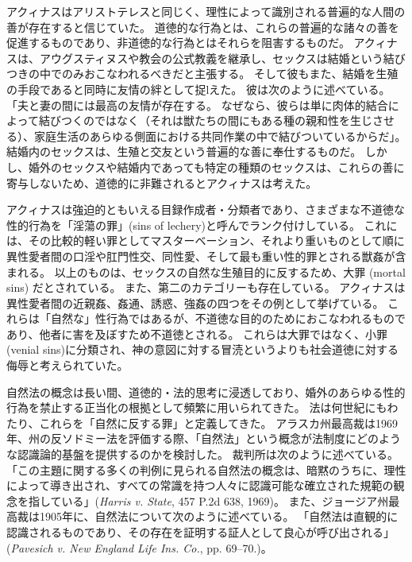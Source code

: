 \documentclass[paper=a4,book,openany]{jlreq} \usepackage{mystyle}
\begin{document}
アクィナスはアリストテレスと同じく、理性によって識別される普遍的な人間の善が存在すると信じていた。
道徳的な行為とは、これらの普遍的な諸々の善を促進するものであり、非道徳的な行為とはそれらを阻害するものだ。
アクィナスは、アウグスティヌスや教会の公式教義を継承し、セックスは結婚という結びつきの中でのみおこなわれるべきだと主張する。
そして彼もまた、結婚を生殖の手段であると同時に友情の絆として捉lえた。
彼は次のように述べている。
「夫と妻の間には最高の友情が存在する。
なぜなら、彼らは単に肉体的結合によって結びつくのではなく（それは獣たちの間にもある種の親和性を生じさせる）、家庭生活のあらゆる側面における共同作業の中で結びついているからだ」\citep[Bk.3 Pt. 2 Chap. 123]{aquinas55:_summa_gentil}。
結婚内のセックスは、生殖と交友という普遍的な善に奉仕するものだ。
しかし、婚外のセックスや結婚内であっても特定の種類のセックスは、これらの善に寄与しないため、道徳的に非難されるとアクィナスは考えた。

アクィナスは強迫的ともいえる目録作成者・分類者であり、さまざまな不道徳な性的行為を「淫蕩の罪」(sins of lechery)と呼んでランク付けしている。
これには、その比較的軽い罪としてマスターベーション、それより重いものとして順に異性愛者間の口淫や肛門性交、同性愛、そして最も重い性的罪とされる獣姦が含まれる。
以上のものは、セックスの自然な生殖目的に反するため、大罪 (mortal sins) だとされている。
また、第二のカテゴリーも存在している。
アクィナスは異性愛者間の近親姦、姦通、誘惑、強姦の四つをその例として挙げている。
これらは「自然な」性行為ではあるが、不道徳な目的のためにおこなわれるものであり、他者に害を及ぼすため不道徳とされる。
これらは大罪ではなく、小罪(venial sins)に分類され、神の意図に対する冒涜というよりも社会道徳に対する侮辱と考えられていた\citep[cf.][II.ii, Question 154]{aquinas20:_summa_theol}。

自然法の概念は長い間、道徳的・法的思考に浸透しており、婚外のあらゆる性的行為を禁止する正当化の根拠として頻繁に用いられてきた。
法は何世紀にもわたり、これらを「自然に反する罪」と定義してきた。
アラスカ州最高裁は1969年、州の反ソドミー法を評価する際、「自然法」という概念が法制度にどのような認識論的基盤を提供するのかを検討した。
裁判所は次のように述べている。
「この主題に関する多くの判例に見られる自然法の概念は、暗黙のうちに、理性によって導き出され、すべての常識を持つ人々に認識可能な確立された規範の観念を指している」(\emph{Harris v. State}, 457 P.2d 638, 1969)。
また、ジョージア州最高裁は1905年に、自然法について次のように述べている。
「自然法は直観的に認識されるものであり、その存在を証明する証人として良心が呼び出される」(\emph{Pavesich v. New England Life Ins. Co.}, pp. 69--70.)。
\end{document}
